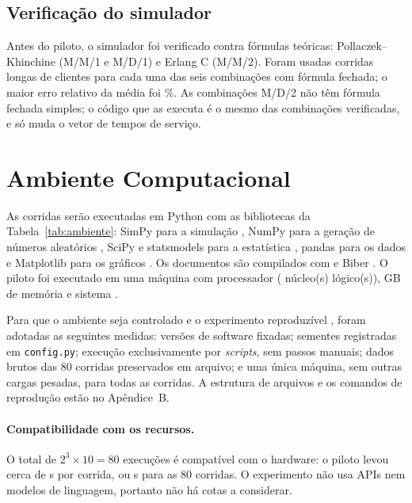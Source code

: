 \documentclass[stu,a4paper,12pt,floatsintext,biblatex]{apa7}
\begin{document}
\subsection{Verificação do simulador}
Antes do piloto, o simulador foi verificado contra fórmulas teóricas: Pollaczek--Khinchine (M/M/1 e M/D/1) e Erlang C (M/M/2).
Foram usadas \VerifReps{} corridas longas de \VerifNLongo{} clientes para cada uma das seis combinações com fórmula fechada; o maior erro relativo da média foi \VerifMaxErro{}\%.
As combinações M/D/2 não têm fórmula fechada simples; o código que as executa é o mesmo das combinações verificadas, e só muda o vetor de tempos de serviço.

\section{Ambiente Computacional}
As corridas serão executadas em Python com as bibliotecas da Tabela~\ref{tab:ambiente}: SimPy para a simulação \parencite{simpy}, NumPy para a geração de números aleatórios \parencite{harris2020}, SciPy e statsmodels para a estatística \parencite{virtanen2020,seabold2010}, pandas para os dados \parencite{mckinney2010} e Matplotlib para os gráficos \parencite{hunter2007}.
Os documentos são compilados com \SwTeX{} e Biber \SwBiber{}.
O piloto foi executado em uma máquina com processador \HwCPU{} (\HwNucleos{} núcleo(s) lógico(s)), \HwRAM{} GB de memória e sistema \HwSO{}.

\begin{table}[H]
\caption{Versões de software usadas no piloto}
\label{tab:ambiente}

\end{table}

Para que o ambiente seja controlado e o experimento reproduzível \parencite{sandve2013,wilson2017}, foram adotadas as seguintes medidas: versões de software fixadas; sementes registradas em \texttt{config.py}; execução exclusivamente por \emph{scripts}, sem passos manuais; dados brutos das 80 corridas preservados em arquivo; e uma única máquina, sem outras cargas pesadas, para todas as corridas.
A estrutura de arquivos e os comandos de reprodução estão no Apêndice~B.

\paragraph{Compatibilidade com os recursos.}
O total de $2^3 \times 10 = 80$ execuções é compatível com o hardware: o piloto levou cerca de \PilotoTempo{} s por corrida, ou \TempoTotalEstimado{} s para as 80 corridas.
O experimento não usa APIs nem modelos de linguagem, portanto não há cotas a considerar.
\end{document}
